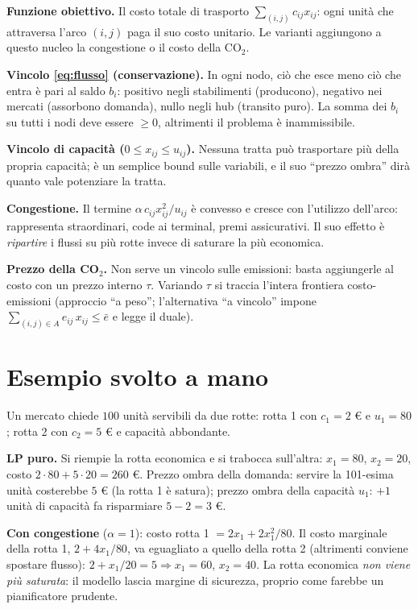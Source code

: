 \begin{spiegazione}
\textbf{Funzione obiettivo.} Il costo totale di trasporto $\sum_{(i,j)} c_{ij} x_{ij}$:
ogni unità che attraversa l'arco $(i,j)$ paga il suo costo unitario. Le varianti
aggiungono a questo nucleo la congestione o il costo della CO$_2$.

\textbf{Vincolo \eqref{eq:flusso} (conservazione).} In ogni nodo, ciò che esce meno ciò
che entra è pari al saldo $b_i$: positivo negli stabilimenti (producono), negativo nei
mercati (assorbono domanda), nullo negli hub (transito puro). La somma dei $b_i$ su tutti i nodi deve
essere $\ge 0$, altrimenti il problema è inammissibile.

\textbf{Vincolo di capacità ($0 \le x_{ij} \le u_{ij}$).} Nessuna tratta può
trasportare più della propria capacità; è un semplice bound sulle variabili, e il suo
``prezzo ombra'' dirà quanto vale potenziare la tratta.

\textbf{Congestione.} Il termine $\alpha\, c_{ij} x_{ij}^2/u_{ij}$ è convesso e cresce
con l'utilizzo dell'arco: rappresenta straordinari, code ai terminal, premi assicurativi.
Il suo effetto è \emph{ripartire} i flussi su più rotte invece di saturare la più
economica.

\textbf{Prezzo della CO$_2$.} Non serve un vincolo sulle emissioni: basta aggiungerle
al costo con un prezzo interno $\tau$. Variando $\tau$ si traccia l'intera frontiera
costo-emissioni (approccio ``a peso''; l'alternativa ``a vincolo'' impone
$\sum_{(i,j) \in A} e_{ij}\, x_{ij} \le \bar e$ e legge il duale).
\end{spiegazione}

\section{Esempio svolto a mano}

\begin{esempio}
Un mercato chiede $100$ unità servibili da due rotte: rotta 1 con $c_1 = 2$ \euro{} e
$u_1 = 80$; rotta 2 con $c_2 = 5$ \euro{} e capacità abbondante.

\textbf{LP puro.} Si riempie la rotta economica e si trabocca sull'altra:
$x_1 = 80$, $x_2 = 20$, costo $2 \cdot 80 + 5 \cdot 20 = 260$ \euro.
Prezzo ombra della domanda: servire la 101-esima unità costerebbe $5$ \euro{}
(la rotta 1 è satura); prezzo ombra della capacità $u_1$: $+1$ unità di capacità fa
risparmiare $5 - 2 = 3$ \euro.

\textbf{Con congestione} ($\alpha = 1$): costo rotta 1 $= 2x_1 + 2x_1^2/80$. Il costo
marginale della rotta 1, $2 + 4x_1/80$, va eguagliato a quello della rotta 2
(altrimenti conviene spostare flusso): $2 + x_1/20 = 5 \Rightarrow x_1 = 60$,
$x_2 = 40$. La rotta economica \emph{non viene più saturata}: il modello lascia
margine di sicurezza, proprio come farebbe un pianificatore prudente.
\end{esempio}

